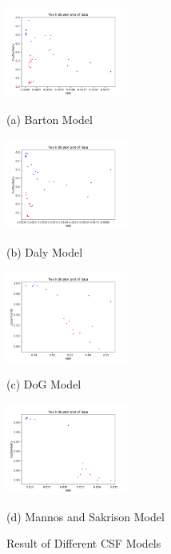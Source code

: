 \documentclass{article}
\begin{document}
\begin{figure}[h]
\begin{minipage}[b]{0.48\linewidth}
  \centering
  \centerline{\includegraphics[width=4.0cm]{images/BartonCSFed_D_1_4_G_01r_23b_result.png}}
  \centerline{(a) Barton Model}\medskip
\end{minipage}
\hfill
\begin{minipage}[b]{0.48\linewidth}
  \centering
  \centerline{\includegraphics[width=4.0cm]{images/DalyCSFed_D_1_8_G_01r_23b_result.png}}
  \centerline{(b)  Daly Model}\medskip
\end{minipage}
\begin{minipage}[b]{.48\linewidth}
  \centering
  \centerline{\includegraphics[width=4.0cm]{images/NewDoG_Streched_CSFed_A1_G_01r_23b_result.png}}
  \centerline{(c) DoG Model}\medskip
\end{minipage}
\hfill
\begin{minipage}[b]{0.48\linewidth}
  \centering
  \centerline{\includegraphics[width=4.0cm]{images/MS_STRECH_CSFED_G_A1_01r_23b_result.png}}
  \centerline{(d) Mannos and Sakrison Model}\medskip
\end{minipage}
%
\caption{Result of Different CSF Models}
\label{fig5}
%
\end{figure}
\end{document}
